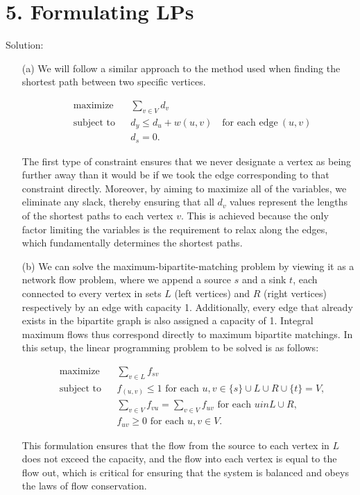 \documentclass{article}
\begin{document}
\pagebreak
\section*{5. Formulating LPs}
Solution:

\begin{enumerate}
    \item[(a)] We will follow a similar approach to the method used when finding the shortest path between two specific vertices.

    \begin{equation}
    \begin{aligned}
        & \text{maximize} 
        & & \sum_{v \in V} d_v \\
        & \text{subject to}
        & & d_y \leq d_u + w(u, v) \quad \text{for each edge} \ (u, v)  \\
        &&& d_s = 0.
    \end{aligned}
    \end{equation}

    The first type of constraint ensures that we never designate a vertex as being further away than it would be if we took the edge corresponding to that constraint directly. Moreover, by aiming to maximize all of the variables, we eliminate any slack, thereby ensuring that all $d_v$ values represent the lengths of the shortest paths to each vertex $v$. This is achieved because the only factor limiting the variables is the requirement to relax along the edges, which fundamentally determines the shortest paths.


    \item[(b)] We can solve the maximum-bipartite-matching problem by viewing it as a network flow problem, where we append a source \(s\) and a sink \(t\), each connected to every vertex in sets \(L\) (left vertices) and \(R\) (right vertices) respectively by an edge with capacity 1. Additionally, every edge that already exists in the bipartite graph is also assigned a capacity of 1. Integral maximum flows thus correspond directly to maximum bipartite matchings. In this setup, the linear programming problem to be solved is as follows:

    \begin{equation}
    \begin{aligned}
        & \text{maximize}
        & & \sum_{v \in L} f_{sv} \\
        & \text{subject to}
        & & f_{(u,v)} \leq 1 \text{ for each } u, v \in \{ s \} \cup L \cup R \cup \{ t \} = V, \\
        &&& \sum_{v \in V} f_{vu} = \sum_{v \in V} f_{uv} \text{ for each } u in L \cup R, \\
        &&& f_{uv} \geq 0 \text{ for each } u, v \in V.
    \end{aligned}
    \end{equation}

    This formulation ensures that the flow from the source to each vertex in \(L\) does not exceed the capacity, and the flow into each vertex is equal to the flow out, which is critical for ensuring that the system is balanced and obeys the laws of flow conservation.
\end{enumerate}
\end{document}
